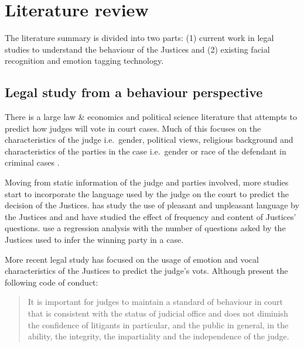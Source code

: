 \documentclass{monashthesis}
\begin{document}
\hypertarget{literature-review}{%
\section{Literature review}\label{literature-review}}

The literature summary is divided into two parts: (1) current work in legal studies to understand the behaviour of the Justices and (2) existing facial recognition and emotion tagging technology.

\hypertarget{legal-study-from-a-behaviour-perspective}{%
\subsection{Legal study from a behaviour perspective}\label{legal-study-from-a-behaviour-perspective}}

There is a large law \& economics and political science literature that attempts to predict how judges will vote in court cases. Much of this focuses on the characteristics of the judge i.e.~gender, political views, religious background and characteristics of the parties in the case i.e.~gender or race of the defendant in criminal cases \autocites{Stuart1962}{Peter1984}{Combining1987}{Susan1988}{Steffensmeier2001}{Kulik2003}.

Moving from static information of the judge and parties involved, more studies start to incorporate the language used by the judge on the court to predict the decision of the Justices. \textcite{black2011emotions} has study the use of pleasant and unpleasant language by the Justices and \textcite{Shullman2004illusion} and \textcite{johnson2009inquiring} have studied the effect of frequency and content of Justices' questions. \textcite{epstein2010inferring} use a regression analysis with the number of questions asked by the Justices used to infer the winning party in a case.

More recent legal study has focused on the usage of emotion and vocal characteristics of the Justices to predict the judge's vots. Although \textcite{judicalguid} present the following code of conduct:

\begin{quote}
It is important for judges to maintain a standard of behaviour in court that is consistent with the status of judicial office and does not diminish the confidence of litigants in particular, and the public in general, in the ability, the integrity, the impartiality and the independence of the judge.
\end{quote}
\end{document}
